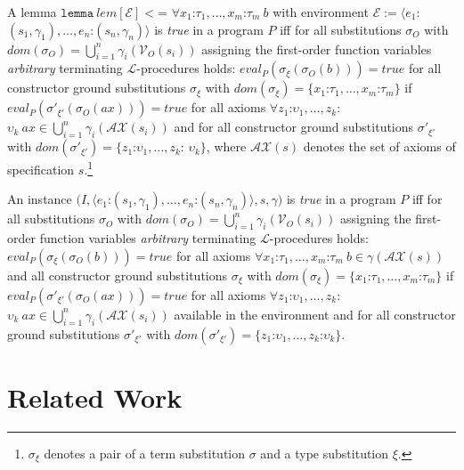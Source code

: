 \documentclass{article}
\theoremstyle{remark}
\theoremstyle{definition}
\newcommand{\vflang}{\ensuremath{\mathcal{L}}}
\newcommand{\itruef}{\mathit{true}}
\newcommand{\name}[1]{\mathit{#1}}
\newcommand{\evalP}{\mathit{eval}_P}
\newcommand{\vars}{\mathcal{V}}
\newcommand{\env}{\mathcal{E}}
\newcommand{\dom}{\mathit{dom}}
\newcommand{\Ax}{\mathcal{AX}}
\begin{document}
A lemma $\mathtt{lemma}\ \name{lem}[\env] <$= $\forall x_1$:$\tau_1,\ldots,x_m$:$\tau_m\ b$ with environment $\env :=
\langle e_1$: $(s_1,\gamma_1),\ldots,e_n$:$(s_n,\gamma_n) \rangle$ is \emph{true} in a program $P$ iff for all
substitutions $\sigma_O$ with $\dom(\sigma_O)=\bigcup_{i=1}^n \gamma_i(\vars_O(s_i))$ assigning the first-order
function variables \emph{arbitrary} terminating \vflang-procedures holds: $\evalP(\sigma_\xi(\sigma_O(b))) = \itruef$
for all constructor ground substitutions $\sigma_\xi$ with $\dom(\sigma_\xi)=\{x_1$:$\tau_1,\ldots,x_m$:$\tau_m\}$ if
$\evalP(\sigma'_{\xi'}(\sigma_O(\name{ax})))=\itruef$ for all axioms $\forall z_1$:$\upsilon_1,\ldots,z_k$:$\upsilon_k\
\name{ax} \in \bigcup_{i=1}^n \gamma_i(\Ax(s_i))$ and for all constructor ground substitutions $\sigma'_{\xi'}$ with
$\dom(\sigma'_{\xi'}) = \{z_1$:$\upsilon_1,\ldots,z_k$: $\upsilon_k\}$, where $\Ax(s)$ denotes the set of axioms of
specification $s$.\footnote[5]{$\sigma_\xi$ denotes a pair of a term substitution $\sigma$ and a type substitution
$\xi$.}

An instance $(I,\langle e_1$:$(s_1,\gamma_1),\ldots,e_n$:$(s_n,\gamma_n)\rangle,s,\gamma)$ is \emph{true} in a program
$P$ iff for all substitutions $\sigma_O$ with $\dom(\sigma_O)=\bigcup_{i=1}^n \gamma_i(\vars_O(s_i))$ assigning the
first-order function variables \emph{arbitrary} terminating \vflang-procedures holds: $\evalP(\sigma_\xi(\sigma_O(b)))
= \itruef$ for all axioms $\forall x_1$:$\tau_1,\ldots,x_m$:$\tau_m\ b \in \gamma(\Ax(s))$ and all constructor ground
substitutions $\sigma_\xi$ with $\dom(\sigma_\xi)=\{x_1$:$\tau_1,\ldots,x_m$:$\tau_m\}$ if
$\evalP(\sigma'_{\xi'}(\sigma_O(\name{ax}))) = \itruef$ for all axioms $\forall
z_1$:$\upsilon_1,\ldots,z_k$:$\upsilon_k\ \name{ax} \in \bigcup_{i=1}^n \gamma_i(\Ax(s_i))$ available in the
environment and for all constructor ground substitutions $\sigma'_{\xi'}$ with
$\dom(\sigma'_{\xi'})=\{z_1$:$\upsilon_1,\ldots,z_k$:$\upsilon_k\}$.


\section{Related Work} \label{sec:related}
\end{document}
